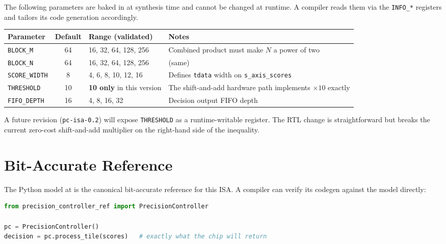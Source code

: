 \documentclass[11pt]{article}
\begin{document}
The following parameters are baked in at synthesis time and cannot be changed
at runtime. A compiler reads them via the \texttt{INFO\_*} registers and
tailors its code generation accordingly.

\begin{table}[h]
\centering
\small
\begin{tabular}{@{}l c l p{5.5cm}@{}}
\toprule
Parameter         & Default & Range (validated)                & Notes \\
\midrule
\texttt{BLOCK\_M}     & 64  & 16, 32, 64, 128, 256              & Combined product must make $N$ a power of two \\
\texttt{BLOCK\_N}     & 64  & 16, 32, 64, 128, 256              & (same) \\
\texttt{SCORE\_WIDTH} & 8   & 4, 6, 8, 10, 12, 16               & Defines \texttt{tdata} width on \texttt{s\_axis\_scores} \\
\texttt{THRESHOLD}    & 10  & \textbf{10 only} in this version  & The shift-and-add hardware path implements $\times 10$ exactly \\
\texttt{FIFO\_DEPTH}  & 16  & 4, 8, 16, 32                      & Decision output FIFO depth \\
\bottomrule
\end{tabular}
\end{table}

\noindent
A future revision (\texttt{pc-isa-0.2}) will expose \texttt{THRESHOLD} as a
runtime-writable register. The RTL change is straightforward but breaks the
current zero-cost shift-and-add multiplier on the right-hand side of the
inequality.

\section{Bit-Accurate Reference}
\label{sec:ref}

The Python model at
 is the canonical
bit-accurate reference for this ISA. A compiler can verify its codegen
against the model directly:

\begin{lstlisting}[language=Python]
from precision_controller_ref import PrecisionController

pc = PrecisionController()
decision = pc.process_tile(scores)   # exactly what the chip will return
\end{lstlisting}
\end{document}

